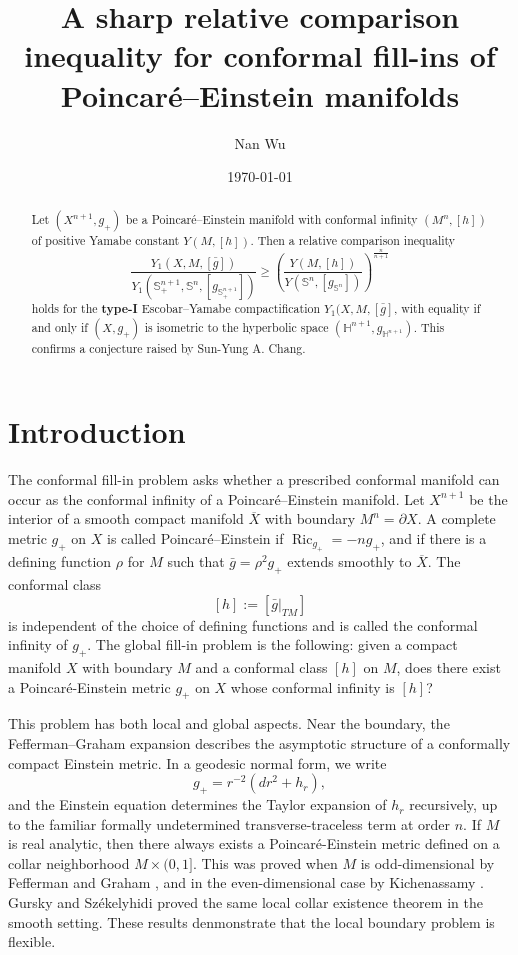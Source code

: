 \documentclass[11pt,letterpaper]{amsart}
\title[]{A sharp relative comparison inequality for conformal fill-ins of Poincar\'e--Einstein manifolds}
\author[N. Wu]{Nan Wu}
\date{\today}
\theoremstyle{definition}
\theoremstyle{remark}
\numberwithin{equation}{section}
\newcommand{\Sph}{\mathbb S}
\newcommand{\Ric}{\operatorname{Ric}}
\newcommand{\barX}{\overline X}
\begin{document}
\begin{abstract}
Let $(X^{n+1},g_+)$ be a Poincar\'e--Einstein manifold with conformal infinity $(M^n,[h])$ of positive Yamabe constant $Y(M,[h])$. Then a relative comparison inequality
\[
 \frac{Y_1(X,M,[\bar g])}{Y_1(\Sph^{n+1}_+,\Sph^n,[g_{\Sph_+^{n+1}}])}
 \ge
 \left(\frac{Y(M,[h])}{Y(\Sph^n,[g_{\Sph^n}])}\right)^{\frac{n}{n+1}}
\]
 holds for the \textbf{type-I} Escobar--Yamabe compactification $Y_1(X,M,[\bar g]$, with equality if and only if $\left(X, g_{+}\right)$ is isometric to the hyperbolic space $\left(\mathbb{H}^{n+1}, g_{\mathbb{H}^{n+1}}\right)$. This confirms a conjecture raised by Sun-Yung A. Chang.
\end{abstract}

\maketitle

\tableofcontents

\section{Introduction}\label{Sect:Introduction}

The conformal fill-in problem asks whether a prescribed conformal manifold can occur as the conformal infinity of a Poincar\'e--Einstein manifold.  Let $X^{n+1}$ be the interior of a smooth compact manifold $\barX$ with boundary $M^n=\partial X$. A complete metric $g_+$ on $X$ is called Poincar\'e--Einstein if
$\Ric_{g_+}=-ng_+$, and if there is a defining function $\rho$ for $M$ such that
$\bar g=\rho^2g_+$ extends smoothly to $\barX$.  The conformal class
\[
  [h]:=[\bar g|_{TM}]
\]
is independent of the choice of defining functions and is called the conformal infinity of $g_+$.  The global fill-in problem is the following: given a compact manifold $X$ with boundary $M$ and a conformal class $[h]$ on $M$, does there exist a Poincar\'e-Einstein metric $g_+$ on $X$ whose conformal infinity is $[h]$?

This problem has both local and global aspects. Near the boundary, the Fefferman--Graham expansion \cite{Fefferman1985conformal} describes the asymptotic structure of a conformally compact Einstein metric.  In a geodesic normal form, we write
\[
  g_+=r^{-2}(dr^2+h_r),
\]
and the Einstein equation determines the Taylor expansion of $h_r$ recursively, up to the familiar formally undetermined transverse-traceless term at order $n$.
If $M$ is real analytic, then there always exists a
Poincaré-Einstein  metric defined on a collar neighborhood $M\times(0, 1]$. This was proved when $M$ is odd-dimensional by Fefferman and Graham \cite{Fefferman1985conformal}, and in the even-dimensional
case by Kichenassamy \cite{Kichenassamy2004}.
Gursky and Sz\'ekelyhidi \cite{GurskySzekelyhidi} proved the same local collar existence theorem in the smooth setting. These results denmonstrate that the local boundary problem is flexible. 
\end{document}
